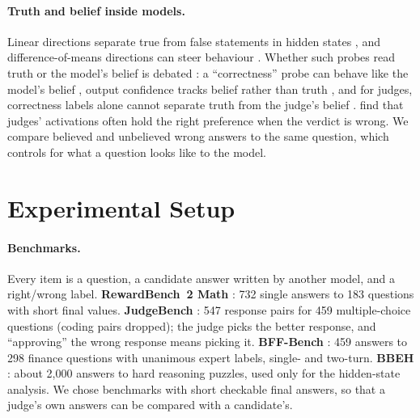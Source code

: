 \documentclass[11pt]{article}
\begin{document}
\paragraph{Truth and belief inside models.}
Linear directions separate true from false statements in hidden states \citep{marks2024geometry,burns2023discovering,
azaria-mitchell-2023-internal}, and difference-of-means directions can steer behaviour
\citep{rimsky-etal-2024-steering,arditi2024refusal,zou2023representation}. Whether such probes read truth or the
model's belief is debated \citep{herrmann2025standards}: a ``correctness'' probe can behave like the model's belief
\citep{yang2026admit}, output confidence tracks belief rather than truth \citep{cho2026confidence}, and for judges,
correctness labels alone cannot separate truth from the judge's belief \citep{gulati2026auditing}.
\citet{mukherjee2026opening} find that judges' activations often hold the right preference when the verdict is
wrong. We compare believed and unbelieved wrong answers to the same question, which controls for what a question
looks like to the model.

\section{Experimental Setup}
\label{sec:setup}

\paragraph{Benchmarks.}
Every item is a question, a candidate answer written by another model, and a right/wrong label.
\textbf{RewardBench~2 Math} \citep{malik2025rewardbench2}: 732 single answers to 183 questions with short final
values. \textbf{JudgeBench} \citep{tan2025judgebench}: 547 response pairs for 459 multiple-choice questions (coding
pairs dropped); the judge picks the better response, and ``approving'' the wrong response means picking it.
\textbf{BFF-Bench} \citep{krumdick2026nofreelabels}: 459 answers to 298 finance questions with unanimous expert labels,
single- and two-turn. \textbf{BBEH} \citep{kazemi-etal-2025-big}: about 2,000 answers to hard reasoning puzzles,
used only for the hidden-state analysis. We chose benchmarks with short checkable final answers, so that a judge's
own answers can be compared with a candidate's.
\end{document}
